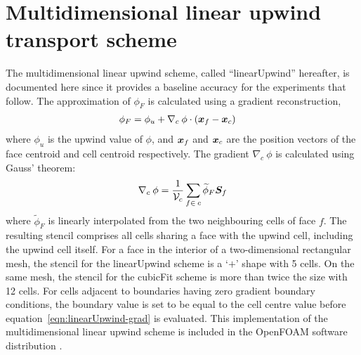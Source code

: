 \section{Multidimensional linear upwind transport scheme}

The multidimensional linear upwind scheme, called ``linearUpwind'' hereafter, is documented here since it provides a baseline accuracy for the experiments that follow.  The approximation of $\phi_F$ is calculated using a gradient reconstruction,
\begin{align}
	\phi_F &= \phi_u + \nabla_c\: \phi \cdot \left(\bm{x}_f - \bm{x}_c \right)
\end{align} 
where $\phi_u$ is the upwind value of $\phi$, and $\bm{x}_f$ and $\bm{x}_c$ are the position vectors of the face centroid and cell centroid respectively.
The gradient $\nabla_c \:\phi$ is calculated using Gauss' theorem:
\begin{align}
	\nabla_c\: \phi = \frac{1}{\mathcal{V}_c} \sum_{f\in\:c} \widetilde{\phi}_F \bm{S}_f \label{eqn:linearUpwind-grad}
\end{align}
where $\widetilde{\phi}_F$ is linearly interpolated from the two neighbouring cells of face $f$.
The resulting stencil comprises all cells sharing a face with the upwind cell, including the upwind cell itself.  For a face in the interior of a two-dimensional rectangular mesh, the stencil for the linearUpwind scheme is a `$+$' shape with 5 cells.  On the same mesh, the stencil for the cubicFit scheme is more than twice the size with 12 cells.
For cells adjacent to boundaries having zero gradient boundary conditions, the boundary value is set to be equal to the cell centre value before equation~\eqref{eqn:linearUpwind-grad} is evaluated.
This implementation of the multidimensional linear upwind scheme is included in the OpenFOAM software distribution \citep{openfoam-numerics}.
